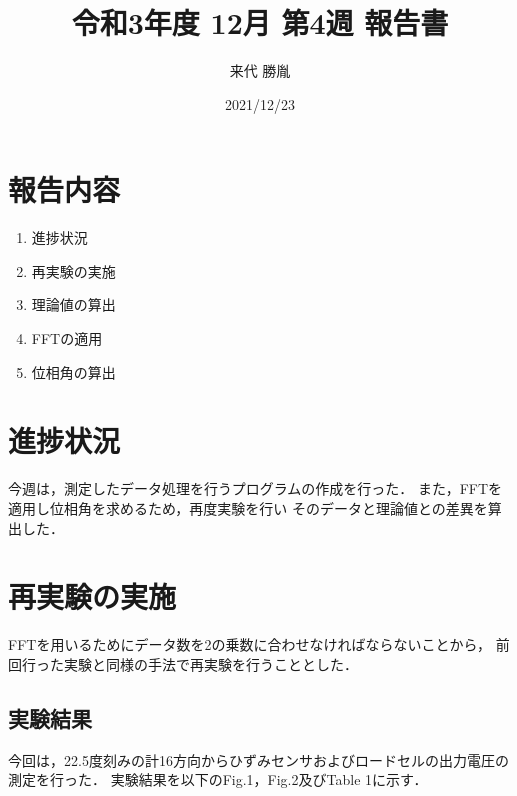 \documentclass[twocolumn,a4j]{jsarticle}
\author{来代 勝胤}
\title{令和3年度 12月 第4週 報告書}
\date{2021/12/23}
\begin{document}
\columnseprule=0.1mm

\maketitle
\section*{報告内容}
\begin{enumerate}[1.]
    \item 進捗状況
    \item 再実験の実施
    \item 理論値の算出
    \item FFTの適用
    \item 位相角の算出
\end{enumerate}

\section{進捗状況}
今週は，測定したデータ処理を行うプログラムの作成を行った．
また，FFTを適用し位相角を求めるため，再度実験を行い
そのデータと理論値との差異を算出した．

\section{再実験の実施}
FFTを用いるためにデータ数を2の乗数に合わせなければならないことから，
前回行った実験と同様の手法で再実験を行うこととした．\\

\subsection{実験結果}
今回は，22.5度刻みの計16方向からひずみセンサおよびロードセルの出力電圧の測定を行った．
実験結果を以下のFig.1，Fig.2及びTable 1に示す．\\
\end{document}
